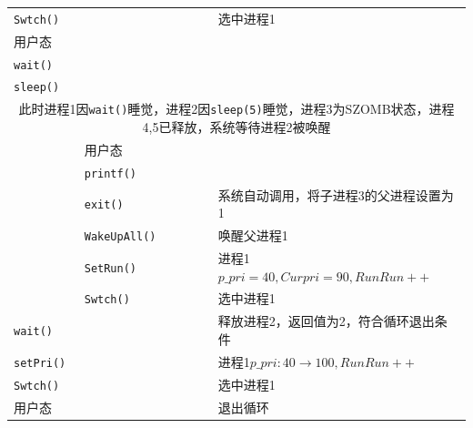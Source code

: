 \begin{landscape}
\begin{longtable}{llllll}
    \texttt{Swtch()} &                  &                &           &             &选中进程1\\
用户态           &                       &          &           &             &            \\
    \texttt{wait()} &                  &                &           &             &\\
\texttt{sleep()} &                      &          &           &             &      \\
                \multicolumn{6}{c}{此时进程1因\texttt{wait()}睡觉，进程2因\texttt{sleep(5)}睡觉，进程3为SZOMB状态，进程4,5已释放，系统等待进程2被唤醒}\\
                 &                用户态 &        &           &             &\\
                 &                \texttt{printf()}   &                &           &             &\\
                 &                \texttt{exit()}   &                &           &             &系统自动调用，将子进程3的父进程设置为1\\
                 &                \texttt{WakeUpAll()}   &                &           &             &唤醒父进程1\\
                 &                \texttt{SetRun()}   &                &           &             &进程1$p\_pri=40,Curpri=90,RunRun++$\\
                 &                \texttt{Swtch()}   &                &           &             &选中进程1\\
    \texttt{wait()} &                  &                &           &             &释放进程2，返回值为2，符合循环退出条件\\
    \texttt{setPri()} &                  &                &           &             &进程1$p\_pri:40\rightarrow 100,RunRun++$\\
    \texttt{Swtch()} &                  &                &           &             &选中进程1\\
    用户态 &                  &                &           &             &退出循环\\\bottomrule
    \end{longtable}
\end{landscape}

